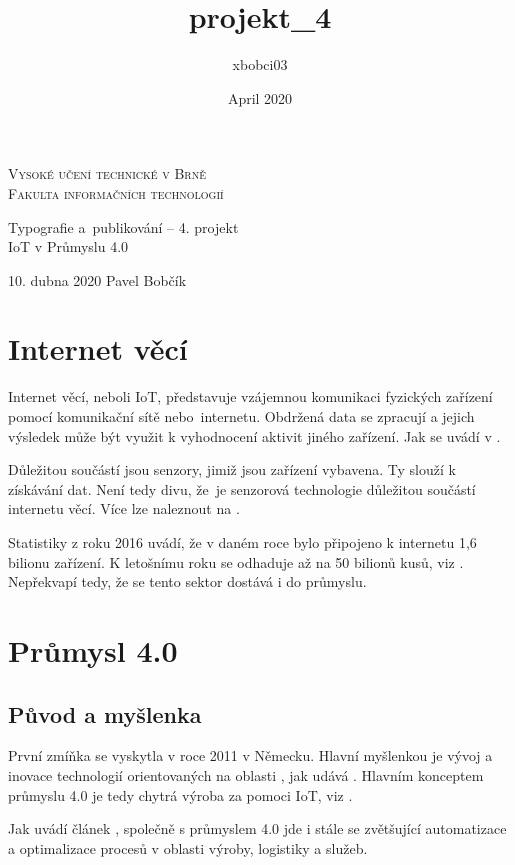 \documentclass[a4paper, 11pt]{article}
\title{projekt_4}
\author{xbobci03 }
\date{April 2020}
\begin{document}
\begin{titlepage}
    \begin{center}
        \thispagestyle{empty}
        {\Huge \textsc{Vysoké učení technické v Brně\\[0.4em]}}
        {\huge \textsc{Fakulta informačních technologií}}
        
        
        {\LARGE Typografie a~publikování -- 4. projekt\\[0.3em]}
        {\Huge IoT v Průmyslu 4.0}
    \end{center}
{\Large 10. dubna 2020 \hfill Pavel Bobčík}
\end{titlepage}

\section{Internet věcí}
Internet věcí, neboli IoT, představuje vzájemnou komunikaci fyzických zařízení pomocí komunikační sítě nebo~internetu. Obdržená data se zpracují a jejich výsledek může být využit k vyhodnocení aktivit jiného zařízení. Jak se uvádí v \cite{Cermak2018}.

Důležitou součástí jsou senzory, jimiž jsou zařízení vybavena. Ty slouží k získávání dat. Není tedy divu, že~je senzorová technologie důležitou součástí internetu věcí. Více lze naleznout na \cite{Fara2019}.

Statistiky z roku 2016 uvádí, že v daném roce bylo připojeno k internetu 1,6 bilionu zařízení. K letošnímu roku se odhaduje až na 50 bilionů kusů, viz \cite{Badurova2019}. Nepřekvapí tedy, že se tento sektor dostává i do průmyslu.

\section{Průmysl 4.0}
\subsection{Původ a myšlenka}
První zmíňka se vyskytla v roce 2011 v Německu. Hlavní myšlenkou je vývoj a inovace technologií orientovaných na oblasti , jak udává \cite{Fara2019}.
Hlavním konceptem průmyslu 4.0 je tedy chytrá výroba za pomoci IoT, viz \cite{Nagpal2020}.

Jak uvádí článek \cite{Cicvakova2017}, společně s průmyslem 4.0 jde i stále se zvětšující automatizace a optimalizace procesů v oblasti výroby, logistiky a služeb.
\end{document}
